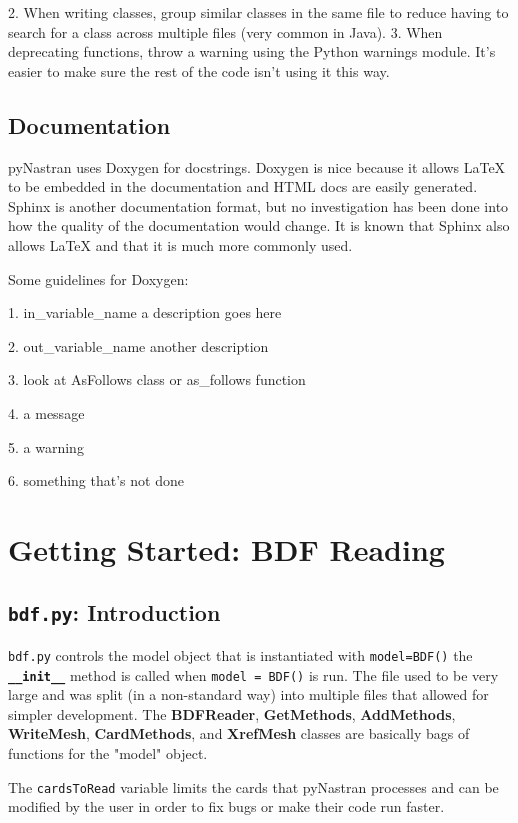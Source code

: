      2.  When writing classes, group similar classes in the same file to reduce having to search for a class across multiple files (very common in Java).
     3.  When deprecating functions, throw a warning using the Python warnings module.  It's easier to make sure the rest of the code isn't using it this way.

 \subsection{Documentation}
     pyNastran uses Doxygen for docstrings.  Doxygen is nice because it allows LaTeX to be embedded in the documentation and HTML docs are easily generated.  Sphinx is another documentation format, but no investigation has been done into how the quality of the documentation would change.  It is known that Sphinx also allows LaTeX and that it is much more commonly used.

    Some guidelines for Doxygen:
     
     1.  \@param  in\_variable\_name a description goes here

     2.  \@retval out\_variable\_name another description

     3.  \@see    look at AsFollows class or as\_follows function

     4.  \@note   a message

     5.  \@warning a warning

     6.  \@todo   something that's not done
     
     

\section{Getting Started: BDF Reading}
 \subsection{{\tt bdf.py}:  Introduction}
     {\tt bdf.py} controls the model object that is instantiated with      {\tt model=BDF()} the {\bf \tt \_\_init\_\_} method is called when {\tt model = BDF()} is run.  The file used to be very large and was split (in a non-standard way) into multiple files that allowed for simpler development.  The {\bf BDFReader}, {\bf GetMethods}, {\bf AddMethods}, {\bf WriteMesh},
     {\bf CardMethods}, and {\bf XrefMesh} classes are basically bags of functions for the "model" object.
     
     The {\tt cardsToRead} variable limits the cards that pyNastran processes and     can be modified by the user in order to fix bugs or make their code run faster.
     
